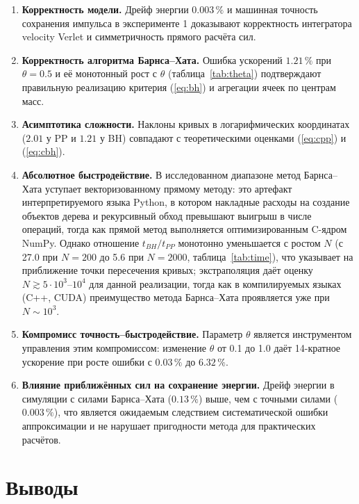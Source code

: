 \documentclass[12pt,a4paper]{article}
\begin{document}
	\begin{enumerate}
		\item \textbf{Корректность модели.} Дрейф энергии $0.003\,\%$ и машинная точность сохранения импульса в эксперименте 1 доказывают корректность интегратора velocity Verlet и симметричность прямого расчёта сил.
		\item \textbf{Корректность алгоритма Барнса--Хата.} Ошибка ускорений $1.21\,\%$ при $\theta = 0.5$ и её монотонный рост с $\theta$ (таблица~\ref{tab:theta}) подтверждают правильную реализацию критерия (\ref{eq:bh}) и агрегации ячеек по центрам масс.
		\item \textbf{Асимптотика сложности.} Наклоны кривых в логарифмических координатах ($2.01$ у PP и $1.21$ у BH) совпадают с теоретическими оценками (\ref{eq:cpp}) и (\ref{eq:cbh}).
		\item \textbf{Абсолютное быстродействие.} В исследованном диапазоне метод Барнса--Хата уступает векторизованному прямому методу: это артефакт интерпретируемого языка Python, в котором накладные расходы на создание объектов дерева и рекурсивный обход превышают выигрыш в числе операций, тогда как прямой метод выполняется оптимизированным C-ядром NumPy. Однако отношение $t_{BH}/t_{PP}$ монотонно уменьшается с ростом $N$ (с 27.0 при $N=200$ до 5.6 при $N=2000$, таблица~\ref{tab:time}), что указывает на приближение точки пересечения кривых; экстраполяция даёт оценку $N \gtrsim 5\cdot10^3\text{--}10^4$ для данной реализации, тогда как в компилируемых языках (C++, CUDA) преимущество метода Барнса--Хата проявляется уже при $N \sim 10^3$.
		\item \textbf{Компромисс точность--быстродействие.} Параметр $\theta$ является инструментом управления этим компромиссом: изменение $\theta$ от 0.1 до 1.0 даёт 14-кратное ускорение при росте ошибки с $0.03\,\%$ до $6.32\,\%$.
		\item \textbf{Влияние приближённых сил на сохранение энергии.} Дрейф энергии в симуляции с силами Барнса--Хата ($0.13\,\%$) выше, чем с точными силами ($0.003\,\%$), что является ожидаемым следствием систематической ошибки аппроксимации и не нарушает пригодности метода для практических расчётов.
	\end{enumerate}
	
	\section{Выводы}
	
\end{document}
